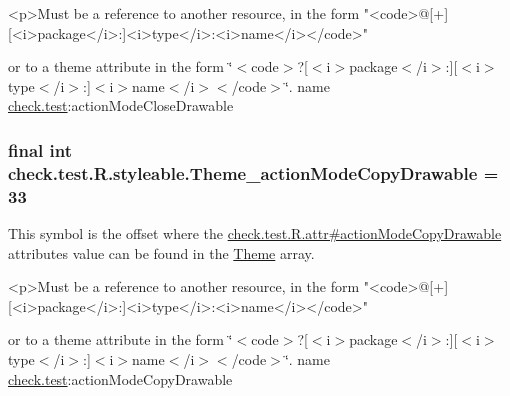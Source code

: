\begin{DoxyVerb}      <p>Must be a reference to another resource, in the form "<code>@[+][<i>package</i>:]<i>type</i>:<i>name</i></code>"
\end{DoxyVerb}
 or to a theme attribute in the form \char`\"{}$<$code$>$?\mbox{[}$<$i$>$package$<$/i$>$\+:\mbox{]}\mbox{[}$<$i$>$type$<$/i$>$\+:\mbox{]}$<$i$>$name$<$/i$>$$<$/code$>$\char`\"{}.  name \hyperlink{namespacecheck_1_1test}{check.\+test}\+:action\+Mode\+Close\+Drawable \hypertarget{classcheck_1_1test_1_1_r_1_1styleable_ada960b6879c62666803bc7cbfd549a66}{}
\subsubsection[{Theme\+\_\+action\+Mode\+Copy\+Drawable}]{\setlength{\rightskip}{0pt plus 5cm}final int check.\+test.\+R.\+styleable.\+Theme\+\_\+action\+Mode\+Copy\+Drawable = 33\hspace{0.3cm}{\ttfamily [static]}}\label{classcheck_1_1test_1_1_r_1_1styleable_ada960b6879c62666803bc7cbfd549a66}
This symbol is the offset where the \hyperlink{classcheck_1_1test_1_1_r_1_1attr_ac1d1297be46cfa54f32f7903f5259324}{check.\+test.\+R.\+attr\#action\+Mode\+Copy\+Drawable} attribute\textquotesingle{}s value can be found in the \hyperlink{classcheck_1_1test_1_1_r_1_1styleable_acca726d02016a0cf607782ec3a436a81}{Theme} array.

\begin{DoxyVerb}      <p>Must be a reference to another resource, in the form "<code>@[+][<i>package</i>:]<i>type</i>:<i>name</i></code>"
\end{DoxyVerb}
 or to a theme attribute in the form \char`\"{}$<$code$>$?\mbox{[}$<$i$>$package$<$/i$>$\+:\mbox{]}\mbox{[}$<$i$>$type$<$/i$>$\+:\mbox{]}$<$i$>$name$<$/i$>$$<$/code$>$\char`\"{}.  name \hyperlink{namespacecheck_1_1test}{check.\+test}\+:action\+Mode\+Copy\+Drawable \hypertarget{classcheck_1_1test_1_1_r_1_1styleable_a46d9dab18374fb132f95dae524a5d910}{}
